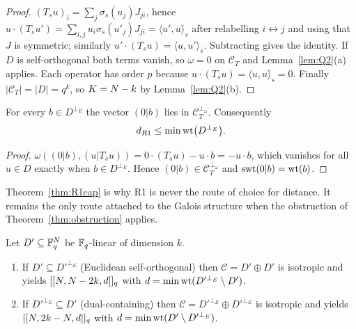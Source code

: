 \begin{proof}
$(T_su)_i=\sum_j\sigma_s(u_j)J_{ji}$, hence
$u\cdot(T_su')=\sum_{i,j}u_i\sigma_s(u'_j)J_{ji}
=\langle u',u\rangle^{\widehat{}}_s$ after relabelling $i\leftrightarrow j$ and
using that $J$ is symmetric; similarly
$u'\cdot(T_su)=\langle u,u'\rangle^{\widehat{}}_s$. Subtracting gives the
identity. If $D$ is self-orthogonal both terms vanish, so $\omega=0$ on
$\mathcal C_T$ and Lemma~\ref{lem:Q2}(a) applies. Each operator has order $p$
because $u\cdot(T_su)=\langle u,u\rangle^{\widehat{}}_s=0$. Finally
$|\mathcal C_T|=|D|=q^k$, so $K=N-k$ by Lemma~\ref{lem:Q2}(b).
\end{proof}

\begin{theorem}\label{thm:R1cap}
For every $b\in D^{\perp_E}$ the vector $(0|b)$ lies in
$\mathcal C_T^{\perp_\omega}$. Consequently
\[
  d_{R1}\le\min\operatorname{wt}\bigl(D^{\perp_E}\bigr).
\]
\end{theorem}

\begin{proof}
$\omega((0|b),(u|T_su))=0\cdot(T_su)-u\cdot b=-u\cdot b$, which vanishes for
all $u\in D$ exactly when $b\in D^{\perp_E}$. Hence
$(0|b)\in\mathcal C_T^{\perp_\omega}$ and $\operatorname{swt}(0|b)=\operatorname{wt}(b)$.
\end{proof}

Theorem~\ref{thm:R1cap} is why R1 is never the route of choice for distance. It
remains the only route attached to the Galois structure when the obstruction of
Theorem~\ref{thm:obstruction} applies.

\begin{theorem}\label{thm:R2}
Let $D'\subseteq\mathbb F_q^{N}$ be $\mathbb F_q$-linear of dimension $k$.
\begin{enumerate}[label=\textnormal{(\alph*)},leftmargin=*]
\item If $D'\subseteq D'^{\perp_E}$ (Euclidean self-orthogonal) then
  $\mathcal C=D'\oplus D'$ is isotropic and yields
  $[[N,N-2k,d]]_q$ with $d=\min\operatorname{wt}(D'^{\perp_E}\setminus D')$.
\item If $D'^{\perp_E}\subseteq D'$ (dual-containing) then
  $\mathcal C=D'^{\perp_E}\oplus D'^{\perp_E}$ is isotropic and yields
  $[[N,2k-N,d]]_q$ with $d=\min\operatorname{wt}(D'\setminus D'^{\perp_E})$.
\end{enumerate}
\end{theorem}

